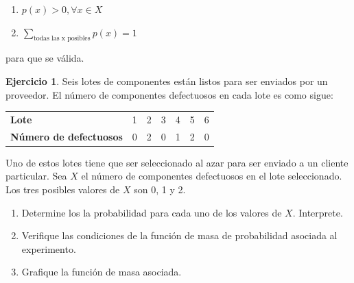 \documentclass[
  11pt,
]{book}
\providecommand{\tightlist}{%
  \setlength{\itemsep}{0pt}\setlength{\parskip}{0pt}}
\theoremstyle{definition}
\theoremstyle{definition}
\theoremstyle{definition}
\newtheorem{exercise}{Ejercicio}[chapter]
\theoremstyle{definition}
\theoremstyle{remark}
\begin{document}
\begin{enumerate}
\def\labelenumi{\arabic{enumi}.}
\tightlist
\item
  \(p(x) > 0, \forall x \in X\)
\item
  \(\displaystyle\sum_{\text{todas las x posibles}} p(x) = 1\)
\end{enumerate}

para que se válida.

\begin{exercise}

Seis lotes de componentes están listos para ser enviados por un proveedor. El número de componentes defectuosos en cada lote es como sigue:

\begin{table}[H]
\centering
\begin{tabular}[t]{>{}lclclcl}
\toprule
\textbf{Lote} & 1 & 2 & 3 & 4 & 5 & 6\\
\textbf{Número de defectuosos} & 0 & 2 & 0 & 1 & 2 & 0\\
\bottomrule
\end{tabular}
\end{table}

\end{exercise}

Uno de estos lotes tiene que ser seleccionado al azar para ser enviado a un cliente particular. Sea \(X\) el número de componentes defectuosos en el lote seleccionado. Los tres posibles valores de \(X\) son 0, 1 y 2.

\begin{enumerate}
\def\labelenumi{\alph{enumi}.}
\tightlist
\item
  Determine los la probabilidad para cada uno de los valores de \(X\). Interprete.
\item
  Verifique las condiciones de la función de masa de probabilidad asociada al experimento.
\item
  Grafique la función de masa asociada.
\end{enumerate}
\end{document}
